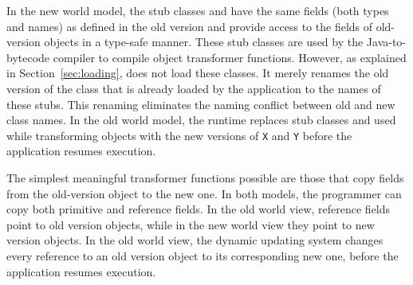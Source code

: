 

In the new world model, the stub classes
\oX and \oY have the same fields (both
types and names) as defined in the old version and provide access to the
fields of old-version objects in a type-safe manner. These stub classes are
used by the Java-to-bytecode compiler to compile object transformer
functions. However, as explained in Section~\ref{sec:loading}, \JV
does not load these classes. It merely renames the old version of the class
that is already loaded by the application to the names of these stubs. This
renaming eliminates the naming conflict between old and new class names. In
the old world model, the runtime replaces stub classes \nX and \nY used while transforming
objects with the new versions of {\tt X} and {\tt Y} before the
application resumes execution.




% 



The simplest meaningful transformer functions possible are those that copy
fields from the old-version object to the new one. In both models, the
programmer can copy both primitive and reference fields. In the old world view,
reference fields point to old version objects, while in the new world view
they point to new version objects. In the old world view, the dynamic
updating system changes every reference to an old version object to its
corresponding new one, before the application resumes execution.

